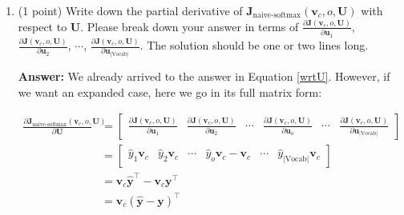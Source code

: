 \documentclass{article}
\newenvironment{answer}{
    {\bf Answer:} \sf \begingroup\color{red}
}{\endgroup}%
\begin{document}
\begin{enumerate}[label=(\alph*)]
\begin{shaded}
\begin{answer}
\begin{equation}
    \frac{\partial \bm J_{\text{naive-softmax}}(\bm v_c, o, \bm U)}{\partial \bm u_w} = \begin{cases}
        \hat{y}_w \bm v_c - \bm v_c  & \text{ if } w = o,\\
        \hat{y}_w \bm v_c & \text{ otherwise}
    \end{cases}
\end{equation}

\end{answer}
\end{shaded}

\item (1 point) Write down the partial derivative of $\bm J_{\text{naive-softmax}}(\bm v_c, o, \bm U)$ with respect to $\bm U$. Please break down your answer in terms of $\frac{\partial \bm J(\bm v_c, o, \bm U)}{\partial \bm u_1}$, $\frac{\partial \bm J(\bm v_c, o, \bm U)}{\partial \bm u_2}$, $\cdots$, $\frac{\partial \bm J(\bm v_c, o, \bm U)}{\partial \bm u_{|\text{Vocab}|}}$. The solution should be one or two lines long.

\begin{shaded}
\begin{answer} We already arrived to the answer in Equation \ref{wrtU}. However, if we want an expanded case, here we go in its full matrix form:

\begin{align}
    \frac{\partial \bm J_{\text{naive-softmax}}(\bm v_c, o, \bm U)}{\partial \bm U} &=
    \begin{bmatrix}
        \frac{\partial \bm J(\bm v_c, o, \bm U)}{\partial \bm u_1} & 
        \frac{\partial \bm J(\bm v_c, o, \bm U)}{\partial \bm u_2} & 
        \cdots & \frac{\partial \bm J(\bm v_c, o, \bm U)}{\partial \bm u_o} & \cdots &
        \frac{\partial \bm J(\bm v_c, o, \bm U)}{\partial \bm u_{|\text{Vocab}|}}
    \end{bmatrix} \\
    &= \begin{bmatrix}
        \hat{y}_1 \bm v_c & 
        \hat{y}_2 \bm v_c & 
        \cdots & \hat{y}_o \bm v_c - \bm v_c & \cdots &
        \hat{y}_{|\text{Vocab}|} \bm v_c
    \end{bmatrix} \\
    &= \bm v_c \hat{\bm y}^{\top} - \bm v_c \bm y^{\top} \\
    &= \bm v_c (\hat{\bm y} - \bm y)^{\top}
\end{align}


\end{answer}
\end{shaded}
\end{enumerate}
\end{document}
